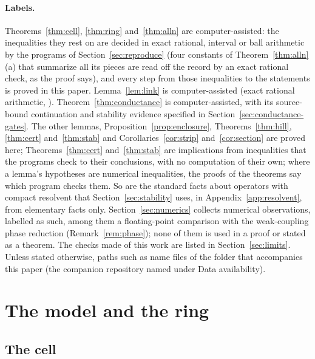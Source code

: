 \documentclass[11pt]{article}
\theoremstyle{definition}
\begin{document}
\paragraph{Labels.} Theorems~\ref{thm:cell}, \ref{thm:ring} and~\ref{thm:alln} are computer-assisted: the inequalities they rest on are decided in exact rational, interval or ball arithmetic by the programs of Section~\ref{sec:reproduce} (four constants of Theorem~\ref{thm:alln}(a) that summarize all its pieces are read off the record by an exact rational check, as the proof says), and every step from those inequalities to the statements is proved in this paper. Lemma~\ref{lem:link} is computer-assisted (exact rational arithmetic, ). Theorem~\ref{thm:conductance} is computer-assisted, with its source-bound continuation and stability evidence specified in Section~\ref{sec:conductance-gates}. The other lemmas, Proposition~\ref{prop:enclosure}, Theorems~\ref{thm:hill}, \ref{thm:cert} and~\ref{thm:stab} and Corollaries~\ref{cor:strip} and~\ref{cor:section} are proved here; Theorems~\ref{thm:cert} and~\ref{thm:stab} are implications from inequalities that the programs check to their conclusions, with no computation of their own; where a lemma's hypotheses are numerical inequalities, the proofs of the theorems say which program checks them. So are the standard facts about operators with compact resolvent that Section~\ref{sec:stability} uses, in Appendix~\ref{app:resolvent}, from elementary facts only. Section~\ref{sec:numerics} collects numerical observations, labelled as such, among them a floating-point comparison with the weak-coupling phase reduction (Remark~\ref{rem:phase}); none of them is used in a proof or stated as a theorem. The checks made of this work are listed in Section~\ref{sec:limits}. Unless stated otherwise, paths such as  name files of the folder that accompanies this paper (the companion repository named under Data availability).

\section{The model and the ring}\label{sec:model}

\subsection{The cell}\label{sec:cell}
\end{document}
